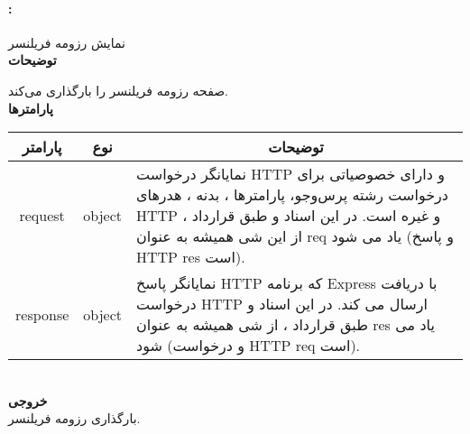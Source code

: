 \paragraph{:}
نمایش رزومه فریلنسر
\\
\textbf{توضیحات}
\hr
\begin{flushleft}
	\framebox[.9\textwidth][l]{
		\lr{
			\textcolor{type}{void}
			\textcolor{func}{getProfile}
			\textcolor{symb}{(}
			\textcolor{type}{object}
			\textcolor{arg}{request}
			\textcolor{symb}{,}
			\textcolor{type}{object}
			\textcolor{arg}{response}
			\textcolor{symb}{);}
		}
	}
\end{flushleft}
صفحه رزومه فریلنسر را بارگذاری می‌کند.
\\
\textbf{پارامترها}
\hr \\[10pt]
\begin{tabular}{|m{4cm}|m{3cm}|m{10cm}|}
	\hline
	\multicolumn{1}{|c}{پارامتر}
	&
	\multicolumn{1}{|c}{نوع}
	&
	\multicolumn{1}{|c|}{توضیحات}
	\\
	\hline
	\multicolumn{1}{|c}{request}
	&
	\multicolumn{1}{|c|}{object}
	&
	نمایانگر درخواست HTTP و دارای خصوصیاتی برای درخواست رشته پرس‌و‌جو، پارامترها ، بدنه ، هدرهای HTTP و غیره است.
	در این اسناد و طبق قرارداد ، از این شی همیشه به عنوان req یاد می شود (و پاسخ HTTP res است).
	\\
	\hline
	\multicolumn{1}{|c}{response}
	&
	\multicolumn{1}{|c|}{object}
	&
	نمایانگر پاسخ HTTP که برنامه Express با دریافت درخواست HTTP ارسال می کند.
	در این اسناد و طبق قرارداد ، از شی همیشه به عنوان res یاد می شود (و درخواست HTTP req است).
	\\
	\hline
\end{tabular}
\\[10pt]
\textbf{خروجی}
\hr \\
بارگذاری رزومه فریلنسر.
